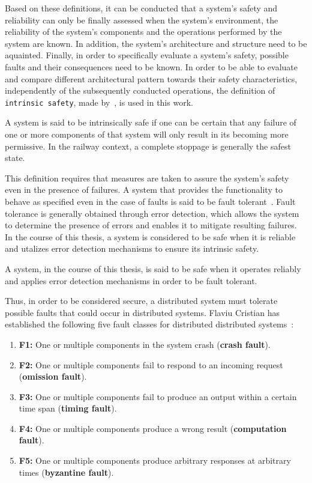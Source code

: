 Based on these definitions, it can be conducted that a system's safety and reliability can only be finally assessed when the system's environment, the reliability of the system's components and the operations performed by the system are known.
In addition, the system's architecture and structure need to be aquainted.
Finally, in order to specifically evaluate a system's safety, possible faults and their consequences need to be known.
In order to be able to evaluate and compare different architectural pattern towards their safety characteristics, independently of the subsequently conducted operations, the definition of \texttt{intrinsic safety}, made by~\cite{BoulangerStandards}, is used in this work.

\begin{definition}
A system is said to be intrinsically safe if one can be certain that any failure of one or more components of that system will only result in its becoming more permissive.
In the railway context, a complete stoppage is generally the safest state.
\label{def:intrinsic_safety}
\end{definition}

This definition requires that measures are taken to assure the system's safety even in the presence of failures.
A system that provides the functionality to behave as specified even in the case of faults is said to be fault tolerant~\cite{AvizienisDependability2001}.
Fault tolerance is generally obtained through error detection, which allows the system to determine the presence of errors and enables it to mitigate resulting failures.
In the course of this thesis, a system is considered to be safe when it is reliable and utalizes error detection mechanisms to ensure its intrinsic safety.
\begin{definition}
A system, in the course of this thesis, is said to be safe when it operates reliably and applies error detection mechanisms in order to be fault tolerant.
\label{def:safety}
\end{definition}

Thus, in order to be considered secure, a distributed system must tolerate possible faults that could occur in distributed systems.
Flaviu Cristian has established the following five fault classes for distributed distributed systems~\cite{CristianFaultModel}:

\begin{enumerate}
\item \textbf{F1:} One or multiple components in the system crash (\textbf{crash fault}).
\item \textbf{F2:} One or multiple components fail to respond to an incoming request (\textbf{omission fault}).
\item \textbf{F3:} One or multiple components fail to produce an output within a certain time span (\textbf{timing fault}).
\item \textbf{F4:} One or multiple components produce a wrong result (\textbf{computation fault}).
\item \textbf{F5:} One or multiple components produce arbitrary responses at arbitrary times (\textbf{byzantine fault}).
\end{enumerate}

